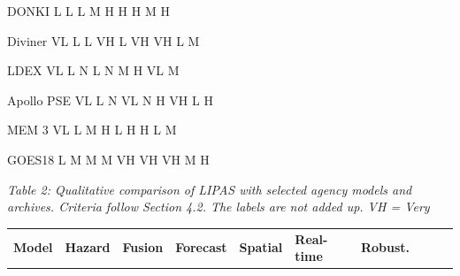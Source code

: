 DONKI L L L M H H H M H

Diviner VL L L VH L VH VH L M

LDEX VL L N L N M H VL M

Apollo PSE VL L N VL N H VH L H

MEM 3 VL L M H L H H L M

GOES18 L M M M VH VH VH M H

\emph{Table 2: Qualitative comparison of LIPAS with selected agency models and archives. Criteria follow Section 4.2. The labels are not added up. VH = Very}

{\def\LTcaptype{none} %
\begin{longtable}[]{@{}
  >{\centering\arraybackslash}p{}
  >{\centering\arraybackslash}p{}
  >{\centering\arraybackslash}p{}
  >{\centering\arraybackslash}p{}
  >{\centering\arraybackslash}p{}
  >{\centering\arraybackslash}p{}
  >{\centering\arraybackslash}p{}
  >{\centering\arraybackslash}p{}
  >{\centering\arraybackslash}p{}
  >{\centering\arraybackslash}p{}@{}}
\toprule\noalign{}
\begin{minipage}[b]{\linewidth}\centering
\textbf{Model}
\end{minipage} & \begin{minipage}[b]{\linewidth}\centering
\textbf{Hazard}
\end{minipage} & \begin{minipage}[b]{\linewidth}\centering
\textbf{Fusion}
\end{minipage} & \begin{minipage}[b]{\linewidth}\centering
\textbf{Forecast}
\end{minipage} & \begin{minipage}[b]{\linewidth}\centering
\textbf{Spatial}
\end{minipage} & \begin{minipage}[b]{\linewidth}\centering
\textbf{Real-time}
\end{minipage} & \begin{minipage}[b]{\linewidth}\centering
\textbf{Robust.}
\end{minipage} & \begin{minipage}[b]{\linewidth}\centering

\end{minipage}
\end{longtable}}
